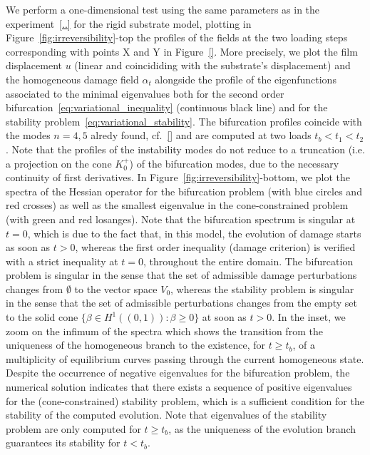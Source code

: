 We perform a one-dimensional test using the same parameters as in the experiment~\ref{..} for the rigid substrate model, plotting in Figure~\ref{fig:irreversibility}-top the profiles of the fields at the two loading steps corresponding with points X and Y in Figure~\ref{}.
More precisely, we plot the film displacement $u$ (linear and coincididing with the substrate's displacement) and the homogeneous damage field $\alpha_t$ alongside the profile of the eigenfunctions associated to the minimal eigenvalues both for the second order bifurcation~\eqref{eq:variational_inequality} (continuous black line) and for the stability problem~\eqref{eq:variational_stability}.
The bifurcation profiles coincide with the modes $n=4, 5$ alredy found, cf.~\eqref{} and are computed at two loads $t_b < t_1 < t_2$. 
Note that the profiles of the instability modes do not reduce to a truncation (i.e. a projection on the cone $K^+_0$) of the bifurcation modes, due to the necessary continuity of first derivatives. 
In Figure~\ref{fig:irreversibility}-bottom, we plot the spectra of the Hessian operator for the bifurcation problem (with blue circles and red crosses) as well as the smallest eigenvalue in the cone-constrained problem (with green and red losanges). 
Note that the bifurcation spectrum is singular at $t=0$, which is due to the fact that, in this model, the evolution of damage starts as soon as $t>0$, whereas the first order inequality (damage criterion) is verified with a strict inequality at $t=0$, throughout the entire domain. The bifurcation problem is singular in the sense that the set of admissible damage perturbations changes from $\emptyset$ to the vector space $V_0$, whereas the stability problem is singular in the sense that the set of admissible perturbations changes from the empty set to the solid cone $\{\beta\in H^1((0,1)):\beta \geq 0\}$ at soon as $t>0$.
In the inset, we zoom on the infimum of the spectra which shows the transition from the uniqueness of the homogeneous branch to the existence, for $t \geq t_b$, of a multiplicity of equilibrium curves passing through the current homogeneous state.
Despite the occurrence of negative eigenvalues for the bifurcation problem, the numerical solution indicates that there exists a sequence of positive eigenvalues for the (cone-constrained) stability problem, which is a sufficient condition for the stability of the computed evolution. Note that eigenvalues of the stability problem are only computed for $t\geq t_b$, as the uniqueness of the evolution branch guarantees its stability for $t<t_b$.


